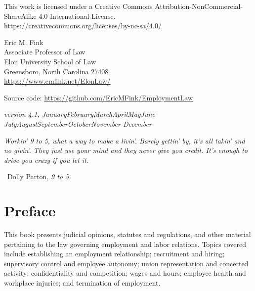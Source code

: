 \documentclass[
  letterpaper,
  11pt,
  DIV=9,
  openright]{scrbook}
\newcommand{\openepigraph}[3]{ 
{\noindent{\color{Maroon}{\Large\faQuoteLeft}}\hspace{.5em}\rmfamily\normalsize
{\itshape{#1}}
\begin{flushright}\noindent{\color{Maroon}{\faPenNib}} ~{#2}, {\itshape{#3}} \end{flushright}}
}
\newcommand{\monthyear}{%
  \ifcase\month\or January\or February\or March\or April\or May\or June\or
  July\or August\or September\or October\or November\or
  December\fi\space\number\year
}
\begin{document}
\begin{small}
\raggedright{This work is licensed under a Creative Commons Attribution-NonCommercial-ShareAlike 4.0 International License.} \\
\url{https://creativecommons.org/licenses/by-nc-sa/4.0/}

\vspace{1em}

Eric M. Fink\\
Associate Professor of Law \\
Elon University School of Law \\
Greensboro, North Carolina 27408 \\
\url{https://www.emfink.net/ElonLaw/}

\vspace{1em}

Source code: \url{https://github.com/EricMFink/EmploymentLaw}

\itshape{version 4.1, \monthyear}

\end{small}
\endgroup

\clearpage


\thispagestyle{empty}

\vspace*{\fill}
\openepigraph{Workin' 9 to 5, what a way to make a livin'. Barely
gettin' by, it's all takin' and no givin'. They just use your mind and
they never give you credit. It's enough to drive you crazy if you let
it.}{Dolly Parton}{9 to 5}
\vspace*{\fill}

\chapter*{Preface}

This book presents judicial opinions, statutes and regulations, and other material pertaining to the law governing employment and labor relations. Topics covered include establishing an employment relationship; recruitment and hiring; supervisory control and employee autonomy; union representation and concerted activity; confidentiality and competition; wages and hours; employee health and workplace injuries; and termination of employment.
\end{document}
